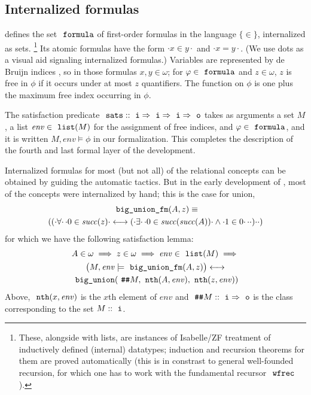 \subsection{Internalized formulas}
\label{sec:internalized-formulas}

 defines the set $\formula$ of first-order 
formulas in the language $\{ \in \}$, internalized as sets.%
\footnote{These, alongside with lists, are instances of
Isabelle/ZF treatment of inductively defined (internal) datatypes;
induction and recursion theorems for them are proved automatically
(this is in constrast to general well-founded recursion, for which
one has to work with the fundamental recursor $\isatt{wfrec}$).}  Its
atomic formulas have the form $\cdot x \in y\cdot$ and $\cdot x =
y\cdot$. (We use dots as a visual aid signaling internalized formulas.)
Variables are represented by de Bruijn indices \cite{MR0321704}, so in
those formulas $x,y \in \omega$; for $\phi\in\formula$ and
$z\in\omega$, $z$ is free in $\phi$ if it occurs under at most $z$
quantifiers. The  function on $\phi$ is one plus the
maximum free index occurring in $\phi$.

The satisfaction predicate
$\isatt{sats}::\tyi\fun\tyi\fun\tyi\fun\tyo$ takes as arguments a set
$M$, a list $\mathit{env}\in\isatt{list}(M)$ for the assignment of
free indices, and $\phi\in\formula$, and it is written
$M,\mathit{env}\models\phi$ in our formalization.
This completes the
description of the fourth and last formal layer of the development.

Internalized formulas for most (but not all) of the relational
concepts can be obtained by guiding the automatic tactics. But in the
early development of 
, most of the concepts were internalized by
hand; this is the case for union,
\begin{multline*}
  \isatt{big{\uscore}union{\uscore}fm}(A,z) \equiv \\
  (({\cdot}\forall{\cdot}\,{\cdot}0 \in \mathit{succ}(z){\cdot} \longleftrightarrow
  ({\cdot}\exists{\cdot}\,{\cdot}0 \in \mathit{succ}(\mathit{succ}(A)){\cdot} \land {\cdot}1 \in
  0{\cdot}\,{\cdot}{\cdot}){\cdot}{\cdot})
\end{multline*}
for which we have the following satisfaction lemma:
\begin{multline}\label{eq:sats_big_union_fm}
  A \in \omega \implies z \in \omega \implies \mathit{env} \in \isatt{list}(M)
  \implies \\
  \bigl(M, \mathit{env} \models \isatt{big{\uscore}union{\uscore}fm}(A,z)\bigr)%
  \longleftrightarrow \\
  \isatt{big{\uscore}union}(\isatt{\#\#} M, \isatt{nth}(A,
  \mathit{env}), \isatt{nth}(z, \mathit{env}))
\end{multline}
Above, $\isatt{nth}(x,\mathit{env})$ is the $x$th element of $\mathit{env}$
and $\isatt{\#\#}M::\tyi\fun \tyo$ is the class corresponding to the
set $M::\tyi$.

